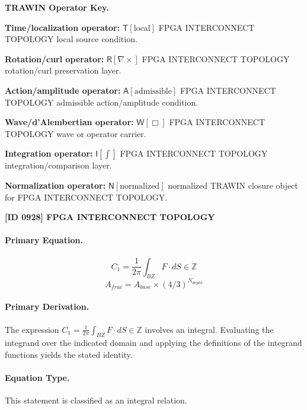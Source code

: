 \par\vspace{0.45\baselineskip}
\noindent\begin{minipage}[t]{\linewidth}
\begingroup
\small
\raggedright
\textbf{TRAWIN Operator Key.}\par
\noindent\textbf{Time/localization operator:} $\mathsf{T}\!\left[\mathrm{local}\right]$ FPGA INTERCONNECT TOPOLOGY local source condition.\par
\noindent\textbf{Rotation/curl operator:} $\mathsf{R}\!\left[\nabla\times\right]$ FPGA INTERCONNECT TOPOLOGY rotation/curl preservation layer.\par
\noindent\textbf{Action/amplitude operator:} $\mathsf{A}\!\left[\mathrm{admissible}\right]$ FPGA INTERCONNECT TOPOLOGY admissible action/amplitude condition.\par
\noindent\textbf{Wave/d'Alembertian operator:} $\mathsf{W}\!\left[\Box\right]$ FPGA INTERCONNECT TOPOLOGY wave or operator carrier.\par
\noindent\textbf{Integration operator:} $\mathsf{I}\!\left[\int\right]$ FPGA INTERCONNECT TOPOLOGY integration/comparison layer.\par
\noindent\textbf{Normalization operator:} $\mathsf{N}\!\left[\mathrm{normalized}\right]$ normalized TRAWIN closure object for FPGA INTERCONNECT TOPOLOGY.\par
\endgroup
\end{minipage}

\clearpage
\noindent\textbf{[ID 0928] FPGA INTERCONNECT TOPOLOGY}\par
\vspace{0.35em}
\paragraph{Primary Equation.}
\[
C_1 = \frac{1}{2\pi} \int_{BZ} F \cdot dS \in \mathbb{Z}
\]
\[
A_{frac} = A_{base} \times (4/3)^{N_{depth}}
\]

\paragraph{Primary Derivation.}
The expression \( C_1 = \frac{1}{2\pi} \int_{BZ} F \cdot dS \in \mathbb{Z} \) involves an integral. Evaluating the integrand over the indicated domain and applying the definitions of the integrand functions yields the stated identity.
\paragraph{Equation Type.}
This statement is classified as an integral relation.

